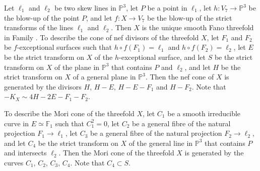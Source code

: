 \documentclass[12pt]{amsart}
\theoremstyle{definition}
\theoremstyle{remark}
\begin{document}
Let $\ell_1$ and $\ell_2$ be two skew lines in $\mathbb{P}^3$, let $P$ be a point in $\ell_1$, let $h\colon V_7\to\mathbb{P}^3$ be the blow-up of the point $P$, and let $f\colon X\to V_7$ be the blow-up of the strict transforms of the lines $\ell_1$ and $\ell_2$. Then $X$ is the unique smooth Fano threefold in Family . To describe the cone of nef divisors of the threefold $X$, let $F_1$ and $F_2$ be $f$-exceptional surfaces such that $h\circ f(F_1)=\ell_1$ and $h\circ f(F_2)=\ell_2$, let $E$ be the strict transform on $X$ of the $h$-exceptional surface, and let $S$ be the strict transform on $X$ of the plane in $\mathbb{P}^3$ that contains $P$ and $\ell_2$, and let $H$ be the strict transform on $X$ of a general plane in $\mathbb{P}^3$. Then the nef cone of $X$ is generated by the divisors $H$, $H-E$, $H-E-F_1$ and $H-F_2$. Note that $-K_X\sim 4H-2E-F_1-F_2$.

To describe the Mori cone of the threefold $X$, let $C_1$ be a smooth irreducible curve in $E\simeq\mathbb{F}_1$ such that $C_1^2=0$, let $C_2$ be a general fibre of the natural projection $F_1\to\ell_1$, let $C_3$ be a general fibre of the natural projection $F_2\to\ell_2$, and let $C_4$ be the strict transform on $X$ of the general line in $\mathbb{P}^3$ that contains $P$ and intersects $\ell_2$. Then the Mori cone of the threefold $X$ is generated by the curves $C_1$, $C_2$, $C_3$, $C_4$. Note that $C_4\subset S$.
\end{document}
